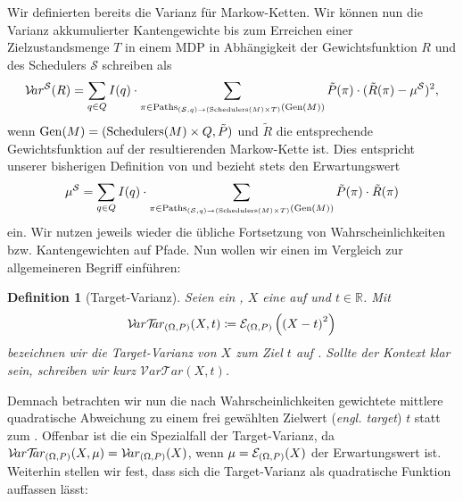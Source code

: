\documentclass[a4paper]{article}
\newcommand{\mc}{Markow-Kette}
\newtheorem{definition}[satz]{Definition} %
\theoremstyle{nonumberplain}
\begin{document}
Wir definierten bereits die Varianz für \mc{}n. Wir können nun die Varianz akkumulierter Kantengewichte bis zum Erreichen einer Zielzustandsmenge $T$ in einem MDP \mdpex{} in Abhängigkeit der Gewichtsfunktion $R$ und des Schedulers $\mathcal{S}$ schreiben als
\[
\mathcal{V}\!ar^{\mathcal{S}}(R) = \sum_{q \in Q}{I(q)} \cdot \sum_{\pi \in \mathrm{Paths}_{(\mathcal{S},q) \rightarrow (\mathrm{Schedulers}(M)\times T)}(\mathrm{Gen}(M))}{\tilde{P}(\pi) \cdot (\tilde{R}(\pi) - \mu^{\mathcal{S}})^2}\text{,}
\]
wenn $\mathrm{Gen}(M)=(\mathrm{Schedulers}(M)\times Q, \tilde{P})$ und $\tilde{R}$ die entsprechende Gewichtsfunktion auf der resultierenden \mc{} ist.
Dies entspricht unserer bisherigen Definition von \var{} und bezieht stets den Erwartungswert
\[
\mu^{\mathcal{S}} = \sum_{q \in Q}{I(q)} \cdot \sum_{\pi \in \mathrm{Paths}_{(\mathcal{S},q) \rightarrow (\mathrm{Schedulers}(M)\times T)}(\mathrm{Gen}(M))}{\tilde{P}(\pi) \cdot \tilde{R}(\pi)}
\]
ein. Wir nutzen jeweils wieder die übliche Fortsetzung von Wahrscheinlichkeiten bzw. Kantengewichten auf Pfade. Nun wollen wir einen im Vergleich zur \var{} allgemeineren Begriff einführen:
\newcommand{\vt}{Target-Varianz}
\newcommand{\mvt}{\mathcal{V}\!ar \mathcal{T}\!\!ar}
\newcommand{\vtex}{$\mvt(M_{\mathcal{S}},x)$}
\begin{definition}[\vt]\label{def-vt}
		Seien \probspaceex{} ein \probspace{}, $X$ eine \rvar{} auf \probspaceex{} und $t \in \mathbb{R}$. Mit
	\begin{equation}
	\mvt_{\probspaceexraw{}}(X,t) \coloneqq \mathcal{E}_{\probspaceexraw{}}\left(\left(X - t\right)^{2}\right)
	\end{equation}
	bezeichnen wir die \vt{} von $X$ zum Ziel $t$ auf  \probspaceex{}. Sollte der Kontext \probspaceex{} klar sein, schreiben wir kurz $\mvt(X,t)$.
	

\end{definition}

Demnach betrachten wir nun die nach Wahrscheinlichkeiten gewichtete mittlere quadratische Abweichung zu einem frei gewählten Zielwert (\textit{engl. target}) $t$ statt zum \expect{}. Offenbar ist die \var{} ein Spezialfall der \vt{}, da $\mvt_{\probspaceexraw{}}(X,\mu) = \mvar_{\probspaceexraw{}}(X)$, wenn $\mu = \mathcal{E}_{(\Omega, P){}}(X)$ der Erwartungswert ist. Weiterhin stellen wir fest, dass sich die \vt{} als quadratische Funktion auffassen lässt:
\end{document}
